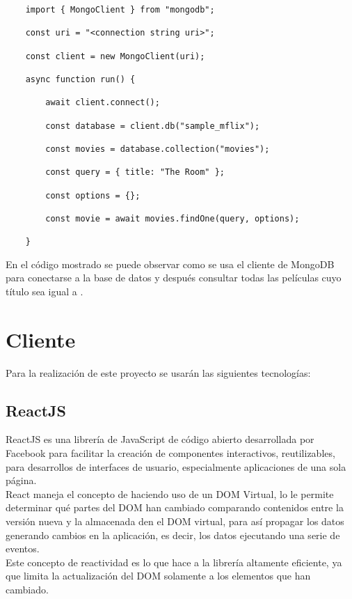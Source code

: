 \begin{lstlisting}
    import { MongoClient } from "mongodb";

    const uri = "<connection string uri>";

    const client = new MongoClient(uri);

    async function run() {

        await client.connect();

        const database = client.db("sample_mflix");

        const movies = database.collection("movies");

        const query = { title: "The Room" };

        const options = {};

        const movie = await movies.findOne(query, options);

    }
\end{lstlisting}

En el código mostrado se puede observar como se usa el cliente de MongoDB 
para conectarse a la base de datos  y después consultar todas las películas cuyo título sea igual a .

\section{Cliente}

Para la realización de este proyecto se usarán las siguientes tecnologías:

\subsection{ReactJS}

ReactJS es una librería de JavaScript de código abierto desarrollada por Facebook para facilitar la creación de componentes interactivos, reutilizables, para desarrollos de interfaces de usuario, especialmente aplicaciones de una sola página.\\

React maneja el concepto de  haciendo uso de un DOM Virtual, lo le permite determinar qué partes del DOM han cambiado comparando contenidos entre la versión nueva y la almacenada den el DOM virtual, para así propagar los datos generando cambios en la aplicación, es decir, los datos  ejecutando una serie de eventos.\\

Este concepto de reactividad es lo que hace a la librería altamente eficiente, ya que limita la actualización del DOM solamente a los elementos que han cambiado.\\

